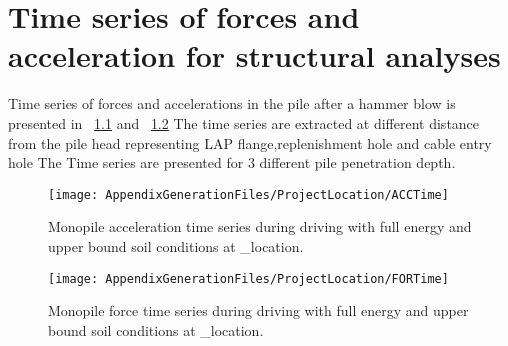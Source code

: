 \chapter{Time series of forces and acceleration for structural analyses}\label{sec_1}

Time series of forces and accelerations in the pile after a hammer blow is presented in 
 ~\ref{Time_Acc} and ~\ref{Time_Force} The time series are extracted at
different distance from the pile head representing LAP flange,replenishment hole and cable entry hole 
The Time series are presented for 3 different pile penetration depth.


\begin{figure}[!htbp]
\texttt{[image: AppendixGenerationFiles/ProjectLocation/ACCTime]}
\caption{Monopile acceleration time series during driving with full energy and upper bound soil conditions at {\ID_location}.}
\label{Time_Acc}\end{figure}

\newpage
\begin{figure}[!htbp]
\texttt{[image: AppendixGenerationFiles/ProjectLocation/FORTime]}
\caption{Monopile force time series during driving with full energy and upper bound soil conditions at {\ID_location}.}
\label{Time_Force}\end{figure}




